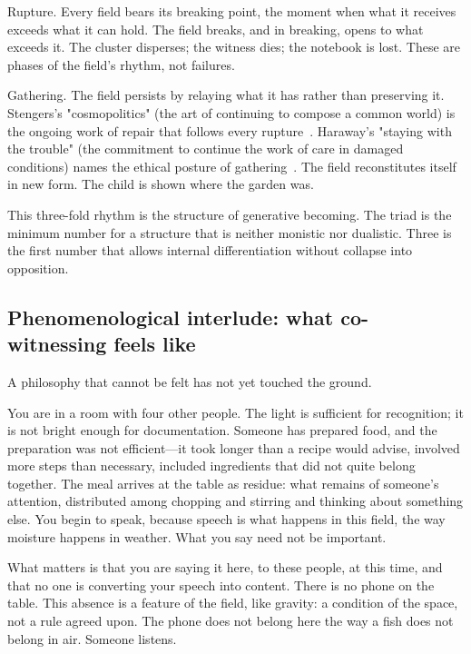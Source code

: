 Rupture. Every field bears its breaking point, the moment when what it receives exceeds what it can hold. The field breaks, and in breaking, opens to what exceeds it. The cluster disperses; the witness dies; the notebook is lost. These are phases of the field's rhythm, not failures.

Gathering. The field persists by relaying what it has rather than preserving it. Stengers's "cosmopolitics" (the art of continuing to compose a common world) is the ongoing work of repair that follows every rupture~\cite{stengers2010}. Haraway's "staying with the trouble" (the commitment to continue the work of care in damaged conditions) names the ethical posture of gathering~\cite{haraway2016}. The field reconstitutes itself in new form. The child is shown where the garden was.

This three-fold rhythm is the structure of generative becoming. The triad is the minimum number for a structure that is neither monistic nor dualistic. Three is the first number that allows internal differentiation without collapse into opposition.

\subsection{Phenomenological interlude: what co-witnessing feels like}

A philosophy that cannot be felt has not yet touched the ground.

You are in a room with four other people. The light is sufficient for recognition; it is not bright enough for documentation. Someone has prepared food, and the preparation was not efficient---it took longer than a recipe would advise, involved more steps than necessary, included ingredients that did not quite belong together. The meal arrives at the table as residue: what remains of someone's attention, distributed among chopping and stirring and thinking about something else. You begin to speak, because speech is what happens in this field, the way moisture happens in weather. What you say need not be important.

What matters is that you are saying it here, to these people, at this time, and that no one is converting your speech into content. There is no phone on the table. This absence is a feature of the field, like gravity: a condition of the space, not a rule agreed upon. The phone does not belong here the way a fish does not belong in air. Someone listens.

